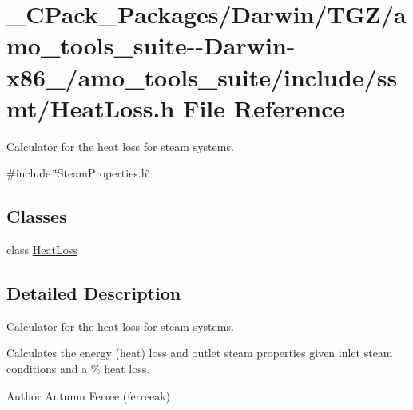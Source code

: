 \hypertarget{___c_pack___packages_2_darwin_2_t_g_z_2amo__tools__suite--_darwin-x86__64_2amo__tools__suite_2include_2ssmt_2_heat_loss_8h}{}\section{\+\_\+\+C\+Pack\+\_\+\+Packages/\+Darwin/\+T\+G\+Z/amo\+\_\+tools\+\_\+suite-\/-\/\+Darwin-\/x86\+\_/amo\+\_\+tools\+\_\+suite/include/ssmt/\+Heat\+Loss.h File Reference}
\label{___c_pack___packages_2_darwin_2_t_g_z_2amo__tools__suite--_darwin-x86__64_2amo__tools__suite_2include_2ssmt_2_heat_loss_8h}


Calculator for the heat loss for steam systems.  


{\ttfamily \#include \char`\"{}Steam\+Properties.\+h\char`\"{}}\newline
\subsection*{Classes}
\begin{DoxyCompactItemize}
\item 
class \hyperlink{class_heat_loss}{Heat\+Loss}
\end{DoxyCompactItemize}


\subsection{Detailed Description}
Calculator for the heat loss for steam systems. 

Calculates the energy (heat) loss and outlet steam properties given inlet steam conditions and a \% heat loss.

\begin{DoxyAuthor}{Author}
Autumn Ferree (ferreeak) 
\end{DoxyAuthor}
